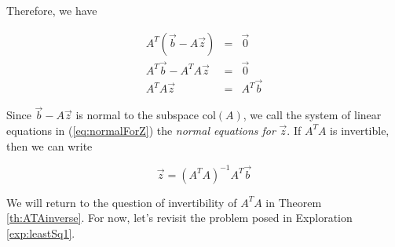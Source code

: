 \documentclass{ximera}
\begin{document}
Therefore, we have

\begin{eqnarray}
A^T(\vec{b}-A\vec{z})&=&\vec{0}\nonumber\\
A^T\vec{b}-A^TA\vec{z}&=&\vec{0}\nonumber\\
A^TA\vec{z}&=&A^T\vec{b}\label{eq:normalForZ}
\end{eqnarray}

Since $\vec{b}-A\vec{z}$ is normal to the subspace $\text{col}(A)$, we call the system of linear equations in (\ref{eq:normalForZ}) the \emph{normal equations for} $\vec{z}$.  If $A^TA$ is invertible, then we can write

\begin{equation}\label{eq:leastSquaresZ}
    \vec{z}=(A^TA)^{-1}A^T\vec{b}
\end{equation}

We will return to the question of invertibility of $A^TA$ in Theorem \ref{th:ATAinverse}.  For now, let's revisit the problem posed in Exploration \ref{exp:leastSq1}.
\end{document}
